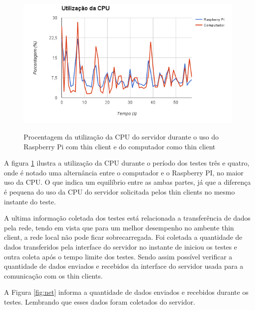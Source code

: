 \documentclass[
	12pt,				%
	openright,			%
	twoside,			%
	a4paper,			%
	chapter=TITLE,		%
	english,			%
	brazil				%
	]{abntex2}
\begin{document}
\begin{figure}[!htb]
\centering
\caption{Procentagem da utilização da CPU do servidor durante o uso do Raspberry Pi com thin client e do computador como thin client}
\includegraphics[scale=0.8]{Imagens/cpu_2}
\label{fig:cpu}
\end{figure}

A figura \ref{fig:cpu} ilustra a utilização da CPU durante o período dos testes três e quatro, onde é notado uma alternância entre o computador e o Raspberry PI, no maior uso da CPU. O que indica um equilíbrio entre as ambas partes, já que a diferença é pequena do uso da CPU do servidor solicitada pelos thin clients  no mesmo instante do teste.

A ultima informação coletada dos testes está relacionada a transferência de dados pela rede, tendo em vista que para um melhor desempenho no ambente thin client, a rede local não pode ficar sobrecarregada. Foi coletada a quantidade de dados transferidos pela interface do servidor no instante de iniciou os testes e outra coleta após o tempo limite dos testes. Sendo assim possível verificar a quantidade de dados enviados e recebidos da interface do servidor usada para a comunicação com os thin clients.

A Figura \ref{fig:net} informa a quantidade de dados enviados e recebidos durante os testes. Lembrando que esses dados foram coletados do servidor.
\end{document}
